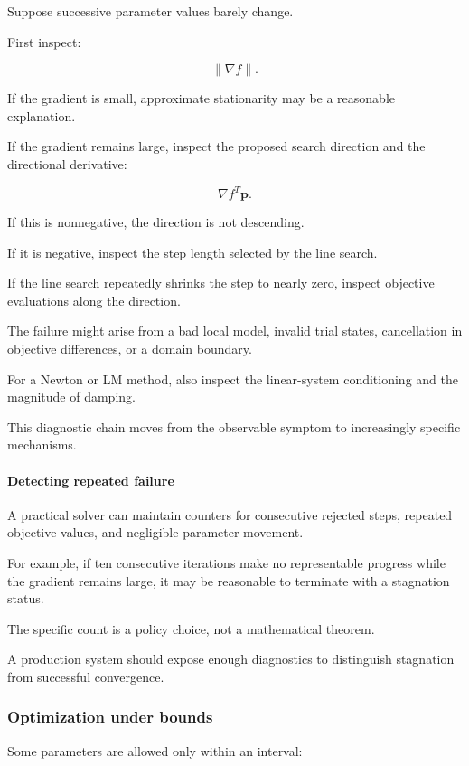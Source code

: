 Suppose successive parameter values barely change.

First inspect:

\[
\|\nabla f\|.
\]

If the gradient is small, approximate stationarity may be a reasonable explanation.

If the gradient remains large, inspect the proposed search direction and the directional derivative:

\[
\nabla f^T\mathbf p.
\]

If this is nonnegative, the direction is not descending.

If it is negative, inspect the step length selected by the line search.

If the line search repeatedly shrinks the step to nearly zero, inspect objective evaluations along the direction.

The failure might arise from a bad local model, invalid trial states, cancellation in objective differences, or a domain boundary.

For a Newton or LM method, also inspect the linear-system conditioning and the magnitude of damping.

This diagnostic chain moves from the observable symptom to increasingly specific mechanisms.

\paragraph{Detecting repeated failure}\label{02-foundations-ii-ch027-detecting-repeated-failure}

A practical solver can maintain counters for consecutive rejected steps, repeated objective values, and negligible parameter movement.

For example, if ten consecutive iterations make no representable progress while the gradient remains large, it may be reasonable to terminate with a stagnation status.

The specific count is a policy choice, not a mathematical theorem.

A production system should expose enough diagnostics to distinguish stagnation from successful convergence.

\subsubsection{Optimization under bounds}\label{02-foundations-ii-ch027-optimization-under-bounds}

Some parameters are allowed only within an interval:

